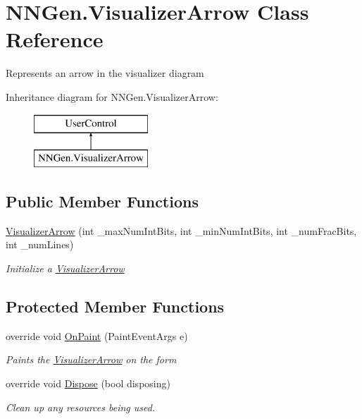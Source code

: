 \hypertarget{class_n_n_gen_1_1_visualizer_arrow}{}\section{N\+N\+Gen.\+Visualizer\+Arrow Class Reference}
\label{class_n_n_gen_1_1_visualizer_arrow}


Represents an arrow in the visualizer diagram  


Inheritance diagram for N\+N\+Gen.\+Visualizer\+Arrow\+:\begin{figure}[H]
\begin{center}
\leavevmode
\includegraphics[height=2.000000cm]{class_n_n_gen_1_1_visualizer_arrow}
\end{center}
\end{figure}
\subsection*{Public Member Functions}
\begin{DoxyCompactItemize}
\item 
\hyperlink{class_n_n_gen_1_1_visualizer_arrow_a94d9f0de399b32b1b93f355a6fb545e9}{Visualizer\+Arrow} (int \+\_\+max\+Num\+Int\+Bits, int \+\_\+min\+Num\+Int\+Bits, int \+\_\+num\+Frac\+Bits, int \+\_\+num\+Lines)
\begin{DoxyCompactList}\small\item\em Initialize a \hyperlink{class_n_n_gen_1_1_visualizer_arrow}{Visualizer\+Arrow} \end{DoxyCompactList}\end{DoxyCompactItemize}
\subsection*{Protected Member Functions}
\begin{DoxyCompactItemize}
\item 
override void \hyperlink{class_n_n_gen_1_1_visualizer_arrow_a11971195bff2ff4fd95500b15e8ab579}{On\+Paint} (Paint\+Event\+Args e)
\begin{DoxyCompactList}\small\item\em Paints the \hyperlink{class_n_n_gen_1_1_visualizer_arrow}{Visualizer\+Arrow} on the form \end{DoxyCompactList}\item 
override void \hyperlink{class_n_n_gen_1_1_visualizer_arrow_a272997db19616bfcc87833477ec2a4ff}{Dispose} (bool disposing)
\begin{DoxyCompactList}\small\item\em Clean up any resources being used. \end{DoxyCompactList}\end{DoxyCompactItemize}

